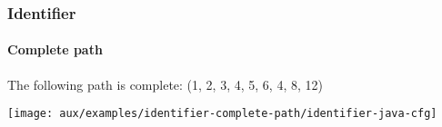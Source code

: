\begin{frame}[hasprev=false,hasnext=false]
\label{example:identifier-complete-path}
\frametitle{Identifier}
\framesubtitle{Complete path}

The following path is complete: (1, 2, 3, 4, 5, 6, 4, 8, 12)

\texttt{[image: aux/examples/identifier-complete-path/identifier-java-cfg]}

\end{frame}